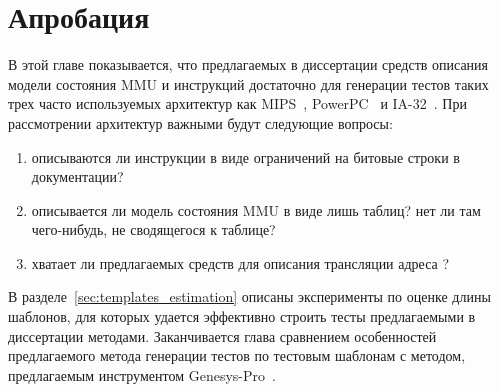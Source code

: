 \chapter{Апробация}

В этой главе показывается, что предлагаемых в диссертации средств
описания модели состояния MMU и инструкций достаточно для генерации
тестов таких трех часто используемых архитектур как MIPS~\cite{mips64II},
PowerPC~\cite{PowerPC} и IA-32~\cite{IA32}. При
рассмотрении архитектур важными будут следующие вопросы:
\begin{enumerate}
    \item описываются ли инструкции в виде ограничений на битовые
    строки в документации?
    \item описывается ли модель состояния MMU в виде лишь таблиц? нет ли там
чего-нибудь, не сводящегося к таблице?
    \item хватает ли предлагаемых средств для описания трансляции адреса ?
\end{enumerate}

В разделе~\ref{sec:templates_estimation} описаны эксперименты по оценке длины шаблонов, для
которых удается эффективно строить тесты предлагаемыми в диссертации
методами. Заканчивается глава
сравнением особенностей предлагаемого метода генерации тестов по
тестовым шаблонам с методом, предлагаемым инструментом
Genesys-Pro~\cite{GenesysPro}.





